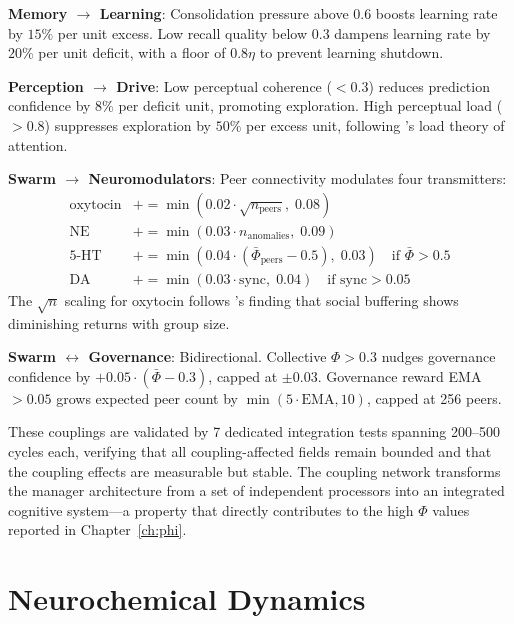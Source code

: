 \documentclass[12pt]{book}
\begin{document}
\textbf{Memory $\to$ Learning}: Consolidation pressure above 0.6 boosts learning rate by $15\%$ per unit excess. Low recall quality below 0.3 dampens learning rate by $20\%$ per unit deficit, with a floor of $0.8\eta$ to prevent learning shutdown.

\textbf{Perception $\to$ Drive}: Low perceptual coherence ($< 0.3$) reduces prediction confidence by $8\%$ per deficit unit, promoting exploration. High perceptual load ($> 0.8$) suppresses exploration by $50\%$ per excess unit, following \citet{friston2010free}'s load theory of attention.

\textbf{Swarm $\to$ Neuromodulators}: Peer connectivity modulates four transmitters:
\begin{align}
\text{oxytocin} &\mathrel{+}= \min(0.02 \cdot \sqrt{n_{\text{peers}}}, \; 0.08) \\
\text{NE} &\mathrel{+}= \min(0.03 \cdot n_{\text{anomalies}}, \; 0.09) \\
\text{5-HT} &\mathrel{+}= \min(0.04 \cdot (\bar{\Phi}_{\text{peers}} - 0.5), \; 0.03) \quad \text{if } \bar{\Phi} > 0.5 \\
\text{DA} &\mathrel{+}= \min(0.03 \cdot \text{sync}, \; 0.04) \quad \text{if sync} > 0.05
\end{align}
The $\sqrt{n}$ scaling for oxytocin follows \citet{kosfeld2005oxytocin}'s finding that social buffering shows diminishing returns with group size.

\textbf{Swarm $\leftrightarrow$ Governance}: Bidirectional. Collective $\Phi > 0.3$ nudges governance confidence by $+0.05 \cdot (\bar{\Phi} - 0.3)$, capped at $\pm 0.03$. Governance reward EMA $> 0.05$ grows expected peer count by $\min(5 \cdot \text{EMA}, 10)$, capped at 256 peers.

These couplings are validated by 7 dedicated integration tests spanning 200--500 cycles each, verifying that all coupling-affected fields remain bounded and that the coupling effects are measurable but stable. The coupling network transforms the manager architecture from a set of independent processors into an integrated cognitive system---a property that directly contributes to the high $\Phi$ values reported in Chapter~\ref{ch:phi}.


\chapter{Neurochemical Dynamics}
\label{ch:neuro}
\end{document}
